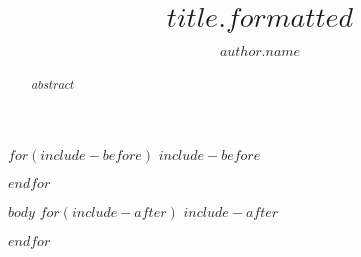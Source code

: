 \documentclass[journal=$journal$,manuscript=$type$]{achemso}
\author{$author.name$}
\affiliation{$author.aff$}
\title[$title.short$]{$title.formatted$}
\begin{document}
$for(include-before)$
$include-before$

$endfor$
\begin{abstract}
$abstract$
\end{abstract}
$body$
$for(include-after)$
$include-after$

$endfor$
\end{document}
